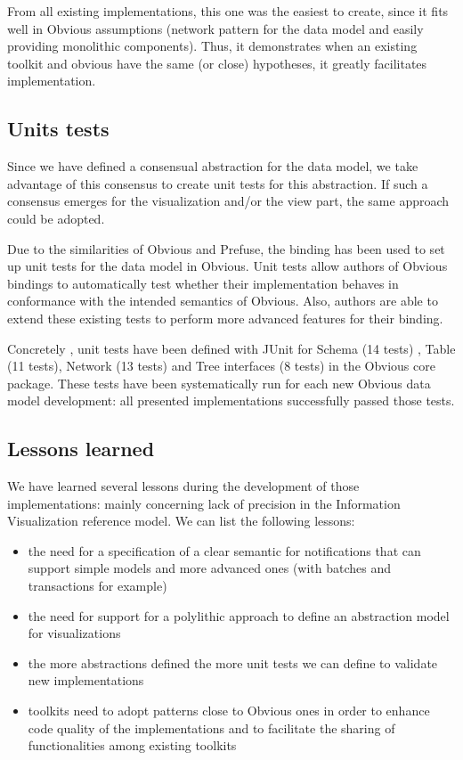 From all existing implementations, this one was the easiest to create, since it fits well in Obvious assumptions (network pattern for the data model and easily providing monolithic components). Thus, it demonstrates when an existing toolkit and obvious have the same (or close)  hypotheses, it greatly facilitates implementation.

\subsection{Units tests}

Since we have defined a consensual abstraction for the data model, we take advantage of this consensus to create unit tests for this abstraction. If such a consensus emerges for the visualization and/or the view part, the same approach could be adopted.

Due to the similarities of Obvious and Prefuse, the binding has been used to set up unit tests for the data model in Obvious. Unit tests allow authors of Obvious bindings to automatically test whether their implementation behaves in conformance with the intended semantics of Obvious. Also, authors are able to extend these existing tests to perform more advanced features for their binding.

Concretely , unit tests have been defined with JUnit  for Schema (14 tests) , Table (11 tests), Network (13 tests) and Tree interfaces (8 tests) in the Obvious core package. These tests have been systematically run for each new Obvious data model development: all presented implementations successfully passed those tests.

\subsection{Lessons learned}

We have learned several lessons during the development of those implementations: mainly concerning lack of precision in the Information Visualization reference model. We can list the following lessons:

\begin{itemize}
\item the need for a specification of a clear semantic for notifications that can support simple models and more advanced ones (with batches and transactions for example)
\item the need for support for a polylithic approach to define an abstraction model for visualizations
\item the more abstractions defined the more unit tests we can define to validate new implementations
\item toolkits need to adopt patterns close to Obvious ones in order to enhance code quality of the implementations and to facilitate the sharing of functionalities among existing toolkits
\end{itemize}

